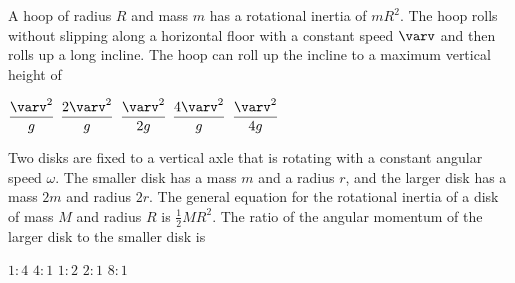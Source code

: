 \documentclass{../../oss-classkick-exam}
\begin{document}
\begin{multicols*}{2}
\begin{questions}
    \question A hoop of radius $R$ and mass $m$ has a rotational inertia of
    $mR^2$. The hoop rolls without slipping along a horizontal floor with a
    constant speed $\varv$ and then rolls up a long incline. The hoop can roll
    up the incline to a maximum vertical height of
    \begin{center}
    \end{center}
    \begin{choices}
      \choice$\dfrac{\varv^2}g$
      \choice$\dfrac{2\varv^2}{g}$
      \choice$\dfrac{\varv^2}{2g}$
      \choice$\dfrac{4\varv^2}{g}$
      \choice$\dfrac{\varv^2}{4g}$
    \end{choices}
    
    \question Two disks are fixed to a vertical axle that is rotating with a
    constant angular speed $\omega$. The smaller disk has a mass $m$ and a
    radius $r$, and the larger disk has a mass $2m$ and radius $2r$. The
    general equation for the rotational inertia of a disk of mass $M$ and
    radius $R$ is $\frac12MR^2$. The ratio of the angular momentum of the
    larger disk to the smaller disk is
    \begin{choices}
      \choice $1:4$
      \choice $4:1$
      \choice $1:2$
      \choice $2:1$
      \choice $8:1$
    \end{choices}
    \columnbreak


\end{questions}
\end{multicols*}
\end{document}
